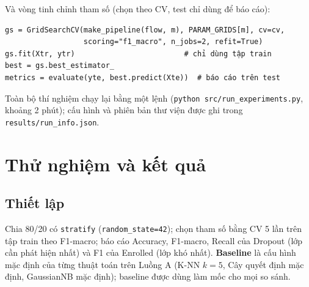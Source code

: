 \documentclass[12pt,a4paper]{article}
\begin{document}
Và vòng tinh chỉnh tham số (chọn theo CV, test chỉ dùng để báo cáo):
\begin{small}\begin{verbatim}
gs = GridSearchCV(make_pipeline(flow, m), PARAM_GRIDS[m], cv=cv,
                  scoring="f1_macro", n_jobs=2, refit=True)
gs.fit(Xtr, ytr)                         # chỉ dùng tập train
best = gs.best_estimator_
metrics = evaluate(yte, best.predict(Xte))  # báo cáo trên test
\end{verbatim}\end{small}
Toàn bộ thí nghiệm chạy lại bằng một lệnh (\texttt{python src/run\_experiments.py}, khoảng 2 phút); cấu hình và phiên bản thư viện
được ghi trong \texttt{results/run\_info.json}.

\section{Thử nghiệm và kết quả}
\subsection{Thiết lập}
Chia 80/20 có \texttt{stratify} (\texttt{random\_state=42}); chọn tham số bằng CV 5 lần trên tập train theo F1-macro; báo cáo Accuracy,
F1-macro, Recall của Dropout (lớp cần phát hiện nhất) và F1 của Enrolled (lớp khó nhất). \textbf{Baseline} là cấu hình mặc định của từng
thuật toán trên Luồng A (K-NN $k=5$, Cây quyết định mặc định, GaussianNB mặc định); baseline được dùng làm mốc cho mọi so sánh.
\end{document}
